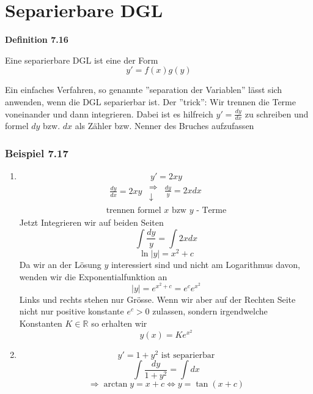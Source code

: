 \section{Separierbare DGL}
\begin{framed}
\centerline{\textbf{Definition 7.16}}
\noindent Eine separierbare DGL ist eine der Form $$y'=f(x)g(y)$$
\end{framed}
Ein einfaches Verfahren, so genannte ''separation der Variablen'' lässt sich anwenden, wenn die DGL separierbar ist. Der ''trick'': Wir trennen die Terme voneinander und dann integrieren. Dabei ist es hilfreich $y'=\frac{dy}{dx}$ zu schreiben und formel $dy$ bzw. $dx$ als Zähler bzw. Nenner des Bruches aufzufassen

\subsubsection*{Beispiel 7.17}
\begin{enumerate}
\item $$y'=2xy$$\[\begin{array}{l}
\begin{array}{*{20}{c}}
{\frac{{dy}}{{dx}} = 2xy}\\
{}
\end{array}\begin{array}{*{20}{c}}
 \Rightarrow \\
 \downarrow 
\end{array}\begin{array}{*{20}{c}}
{\frac{{dy}}{y} = 2xdx}\\
{}
\end{array}\\
{\text{trennen formel }}x{\text{ bzw }}y{\text{ - Terme}}
\end{array}\]
Jetzt Integrieren wir auf beiden Seiten $$\int{\frac{dy}{y}}=\int{2xdx}$$$$\ln\left| y\right|=x^2+c$$Da wir an der Lösung $y$ interessiert sind und nicht am Logarithmus davon, wenden wir die Exponentialfunktion an $$\left| y\right|=e^{x^2+c}=e^ce^{x^2}$$
Links und rechts stehen nur  Grösse. Wenn wir aber auf der Rechten Seite nicht nur positive konstante $e^c>0$ zulassen, sondern irgendwelche Konstanten $K\in\mathbb{R}$ so erhalten wir $$y(x)=Ke^{x^2}$$
\item $$y'=1+y^2\text{ ist separierbar}$$
$$\int{\frac{dy}{1+y^2}=\int{dx}}$$
$$\Rightarrow \arctan y=x+c \Leftrightarrow y=\tan(x+c)$$
\end{enumerate}
